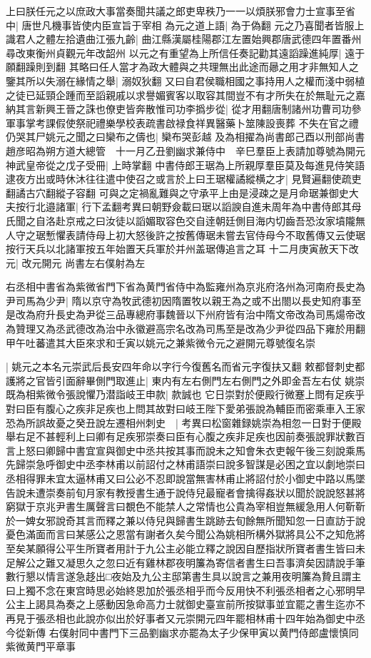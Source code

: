 上曰朕任元之以庶政大事當奏聞共議之郎吏卑秩乃一一以煩朕邪會力士宣事至省中|{
	唐世凡機事皆使内臣宣旨于宰相}
為元之道上語|{
	為于偽翻}
元之乃喜聞者皆服上識君人之體左拾遺曲江張九齡|{
	曲江縣漢屬桂陽郡江左置始興郡唐武德四年置番州尋改東衡州貞觀元年改韶州}
以元之有重望為上所信任奏記勸其遠謟躁進純厚|{
	遠于願翻躁則到翻}
其略曰任人當才為政大體與之共理無出此途而曏之用才非無知人之鑒其所以失溺在緣情之舉|{
	溺奴狄翻}
又曰自君侯職相國之事持用人之權而淺中弱植之徒已延頸企踵而至謟親戚以求譽媚賓客以取容其間豈不有才所失在於無耻元之嘉納其言新興王晉之誅也僚吏皆奔散惟司功李撝步從|{
	從才用翻唐制諸州功曹司功參軍事掌考課假使祭祀禮樂學校表疏書啟禄食祥異醫藥卜筮陳設喪葬}
不失在官之禮仍哭其尸姚元之聞之曰欒布之儔也|{
	欒布哭彭越}
及為相擢為尚書郎己酉以刑部尚書趙彦昭為朔方道大總管　十一月乙丑劉幽求兼侍中　辛巳羣臣上表請加尊號為開元神武皇帝從之戊子受冊|{
	上時掌翻}
中書侍郎王琚為上所親厚羣臣莫及每進見侍笑語逮夜方出或時休沐往往遣中使召之或言於上曰王琚權譎縱横之才|{
	見賢遍翻使疏吏翻譎古穴翻縱子容翻}
可與之定禍亂難與之守承平上由是浸疎之是月命琚兼御史大夫按行北邉諸軍|{
	行下孟翻考異曰朝野僉載曰琚以謟諛自進未周年為中書侍郎其母氏聞之自洛赴京戒之曰汝徒以謟媚取容色交自逹朝廷側目海内切齒吾恐汝家墳隴無人守之琚慙懼表請侍母上初大怒後許之按舊傳琚未嘗去官侍母今不取舊傳又云使琚按行天兵以北諸軍按五年始置天兵軍於并州盖琚傳追言之耳}
十二月庚寅赦天下改元|{
	改元開元}
尚書左右僕射為左

右丞相中書省為紫微省門下省為黄門省侍中為監雍州為京兆府洛州為河南府長史為尹司馬為少尹|{
	隋以京守為牧武德初因隋置牧以親王為之或不出閤以長史知府事至是改為府升長史為尹從三品專總府事魏晉以下州府皆有治中隋文帝改為司馬煬帝改為贊理又為丞武德改為治中永徽避高宗名改為司馬至是改為少尹從四品下雍於用翻}
甲午吐蕃遣其大臣來求和壬寅以姚元之兼紫微令元之避開元尊號復名崇

|{
	姚元之本名元崇武后長安四年命以字行今復舊名而省元字復扶又翻}
敕都督刺史都護將之官皆引面辭畢側門取進止|{
	東内有左右側門左右側門之外即金吾左右仗}
姚崇既為相紫微令張說懼乃潜詣岐王申款|{
	款誠也}
它日崇對於便殿行微蹇上問有足疾乎對曰臣有腹心之疾非足疾也上問其故對曰岐王陛下愛弟張說為輔臣而密乘車入王家恐為所誤故憂之癸丑說左遷相州刺史　|{
	考異曰松窗雜録姚崇為相忽一日對于便殿舉右足不甚輕利上曰卿有足疾邪崇奏曰臣有心腹之疾非足疾也因前奏張說罪狀數百言上怒曰卿歸中書宜宣與御史中丞共按其事而說未之知會朱衣吏報午後三刻說乘馬先歸崇急呼御史中丞李林甫以前詔付之林甫語崇曰說多智謀是必困之宜以劇地崇曰丞相得罪未宜太逼林甫又曰公必不忍即說當無害林甫止將詔付於小御史中路以馬墜告說未遭崇奏前旬月家有教授書生通于說侍兒最寵者會擒得姦狀以聞於說說怒甚將窮獄于京兆尹書生厲聲言曰覩色不能禁人之常情也公貴為宰相豈無緩急用人何靳靳於一婢女邪說奇其言而釋之兼以侍兒與歸書生跳跡去旬餘無所聞知忽一日直訪于說憂色滿面而言曰某感公之恩當有謝者久矣今聞公為姚相所構外獄將具公不之知危將至矣某願得公平生所寶者用計于九公主必能立釋之說因自歷指狀所寶者書生皆曰未足解公之難又凝思久之忽曰近有雞林郡夜明簾為寄信者書生曰吾事濟矣因請說手筆數行懇以情言遂急趍出□夜始及九公主邸第書生具以說言之兼用夜明簾為贄且謂主曰上獨不念在東宫時思必始終恩加於張丞相乎而今反用快不利張丞相者之心邪明早公主上謁具為奏之上感動因急命高力士就御史臺宣前所按獄事並宜罷之書生迄亦不再見于張丞相也此說亦似出於好事者又元崇開元四年罷相林甫十四年始為御史中丞今從新傳}
右僕射同中書門下三品劉幽求亦罷為太子少保甲寅以黄門侍郎盧懷慎同紫微黄門平章事

